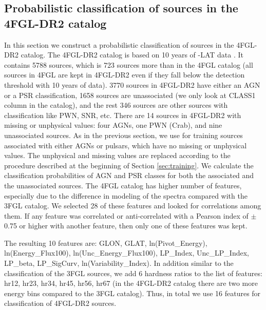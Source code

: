 \subsection{Probabilistic classification of sources in the 4FGL-DR2 catalog}

In this section we construct a probabilistic classification of sources in the 4FGL-DR2 catalog. The 4FGL-DR2 catalog \citep{2020arXiv200511208B} 
is based on 10 years of \Fermi-LAT data \citep[compared to 8 years of data in the 4FGL catalog,][]{2020ApJS..247...33A}.
It contains 5788 sources, which is 723 sources more than in the 4FGL catalog (all sources in 4FGL are kept in 4FGL-DR2 even if they fall
below the detection threshold with 10 years of data). 
3770 sources in 4FGL-DR2 have either an  AGN or a PSR classification, 
1658 sources are unassociated (we only look at CLASS1 column in the catalog), and the rest 346 sources are other sources with classification like PWN, SNR, etc.
There are 14 sources in 4FGL-DR2 with missing or unphysical values: four AGNs, one PWN (Crab), and nine unassociated sources.
As in the previous section, we use for training sources associated with either AGNs or pulsars,
which have no missing or unphysical values.
The unphysical and missing values are replaced according to the procedure described at the beginning of Section \ref{sec:training}.
We calculate the classification probabilities of AGN and PSR classes for both the associated and the unassociated sources.
The 4FGL catalog has higher number of features, especially due to the difference in modeling of the spectra compared with the 3FGL catalog. 
We selected 28 of these features and looked for correlations among them. If any feature was correlated or anti-correlated with a Pearson index of $\pm$0.75 or higher with another feature, then only one of these features was kept. 

The resulting 10 features are:
GLON, GLAT, ln(Pivot\_Energy), ln(Energy\_Flux100), ln(Unc\_Energy\_Flux100), LP\_Index, Unc\_LP\_Index, LP\_beta, LP\_SigCurv, ln(Variability\_Index).
In addition similar to the classification of the 3FGL sources, we add 6 hardness ratios to the list of features:
hr12, hr23, hr34, hr45, hr56, hr67 (in the 4FGL-DR2 catalog there are two more energy bins compared to the 3FGL catalog).
Thus, in total we use 16 features for classification of 4FGL-DR2 sources.


